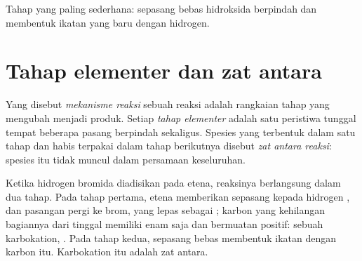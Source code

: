\begin{omfigure}
\qquad\raisebox{0.2ex}{$+$}\qquad
{}
\qquad\raisebox{0.2ex}{$\longrightarrow$}\qquad
{}

{\small Tahap yang paling sederhana: sepasang  bebas 
hidroksida berpindah dan membentuk ikatan  yang baru dengan 
hidrogen.}
\end{omfigure}

\section{Tahap elementer dan zat antara}

\begin{definition}\label{def:g12:curly-arrows:mechanism}
Yang disebut \emph{mekanisme reaksi} sebuah
reaksi adalah rangkaian tahap yang mengubah  menjadi produk.
Setiap \emph{tahap elementer} adalah satu
peristiwa tunggal tempat beberapa pasang  berpindah sekaligus.
Spesies yang terbentuk dalam satu tahap dan habis terpakai dalam tahap
berikutnya disebut \emph{zat antara reaksi}:
spesies itu tidak muncul dalam persamaan keseluruhan.
\end{definition}


\begin{example}\label{ex:g12:curly-arrows:carbocation}
Ketika hidrogen bromida diadisikan pada etena, reaksinya berlangsung
dalam dua tahap. Pada tahap pertama,  etena memberikan
sepasang  kepada hidrogen , dan pasangan  pergi
ke brom, yang lepas sebagai ; karbon yang kehilangan bagiannya
dari  tinggal memiliki enam  saja dan bermuatan
positif: sebuah karbokation, . Pada tahap kedua, sepasang
 bebas  membentuk ikatan dengan karbon itu. Karbokation
itu adalah zat antara.
\end{example}

